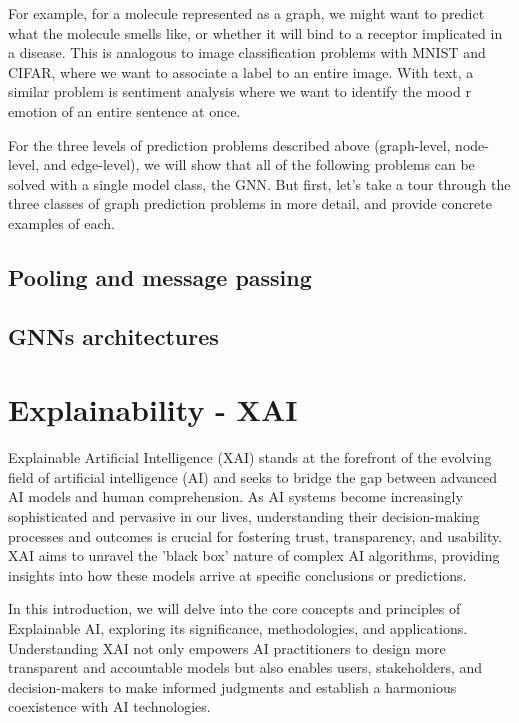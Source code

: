 \documentclass[binding=0.6cm]{sapthesis}
\begin{document}
For example, for a molecule represented as a graph, we might want to predict what the molecule smells like, or whether it will bind to a receptor implicated in a disease. This is analogous to image classification problems with MNIST and CIFAR,  where we want to associate a label to an entire image. With text, a similar problem is sentiment analysis where we want to identify the mood  r emotion of an entire sentence at once.

For the three levels of prediction problems described above (graph-level, node-level, and edge-level), we will show that all of the following problems can be solved with a single model class, the GNN. But first, let’s take a tour through the three classes of graph prediction problems in more detail, and provide concrete examples of each.


\subsection{Pooling and message passing}
\label{sec:bg.gnn.pool-message}
\subsection{GNNs architectures}
\label{sec:bg.gnn.gnn-archs}

\section{Explainability - XAI}
\label{sec:bg.xai}
Explainable Artificial Intelligence (XAI) stands at the forefront of the evolving field of artificial intelligence (AI) and seeks to bridge the gap between advanced AI models and human comprehension. As AI systems become increasingly sophisticated and pervasive in our lives, understanding their decision-making processes and outcomes is crucial for fostering trust, transparency, and usability. XAI aims to unravel the 'black box' nature of complex AI algorithms, providing insights into how these models arrive at specific conclusions or predictions.

In this introduction, we will delve into the core concepts and principles of Explainable AI, exploring its significance, methodologies, and applications. Understanding XAI not only empowers AI practitioners to design more transparent and accountable models but also enables users, stakeholders, and decision-makers to make informed judgments and establish a harmonious coexistence with AI technologies.
\end{document}
